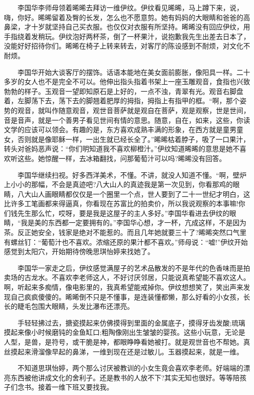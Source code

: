 \documentclass[12pt,UTF8]{ctexbook}
\begin{document}
　　李国华李师母领着晞晞去拜访一维伊纹。伊纹看见晞晞，马上蹲下来，说，嗨，你好。晞晞留着及臀的长发，怎么也不愿意剪。她有妈妈的大眼睛和爸爸的高鼻梁，才十岁就坚持自己买衣服。也仅仅对衣服有所坚持。晞晞没有回应伊纹，用手指绕着发稍玩。伊纹泡好两杯茶，倒了一杯果汁，说抱歉我先生出差去日本了，没能好好招待你们。晞晞在椅子上转来转去，对客厅的陈设感到不耐烦，对文化不耐烦。

　　李国华开始大谈客厅的摆饰。话语本能地在美女面前膨胀，像阳具一样。二十多岁的女人也不是完全不可以。他伸出指头指着书架上一座玉雕观音，食指也兴致勃勃的样子。玉观音一望即知原石是上好的，一点不浊，青翠有光。观音右脚盘着，左脚荡下去，荡下去的脚翘着肥厚的拇指，拇指上有指甲的框。\enquote{啊，那个姿势的观音，就叫作随意观音，观世音菩萨就是观自在菩萨，观是观察，世是世间，音是音声，就是一个善男子看见世间有情的意思。随意，自在，如来，这些，你读文学的应该可以领会。有趣的是，东方喜欢成熟丰满的形象，在西方就是童男童女，否则就是像耶稣一样，一出生就已经长全了。}晞晞枯着脖子，吸了一口果汁，转头对爸妈恶声说：\enquote{你们明知道我不喜欢柳橙汁。}伊纹知道晞晞的意思是她不喜欢听这些。她惊醒一样，去冰箱翻找，问那葡萄汁可以吗?晞晞没有回答。

　　李国华继续扫视。好多西洋美术，不懂。不讲，就没人知道不懂。\enquote{啊，壁炉上小小的那幅，不会是真迹吧?八大山人的真迹我是第一次见到，你看那鸡的眼睛，八大山人画眼睛都仅仅是一个圈里一个点，世人要到了二十一世纪才明白，这比许多工笔画都来得逼真，你看现在苏富比的拍卖价，所以我说观察的本事嘛!你们钱先生那么忙，哎呀，要是我是这屋子的主人多好。}李国华看进去伊纹的眼睛，\enquote{我是美的东西都一定要拥有的。}李国华心想，才一杯，亢成这样，不是因为茶。反正她安全，钱家是绝对不能惹的。而且几年她就要三十了?晞晞突然口气里有螺丝钉：\enquote{葡萄汁也不喜欢。浓缩还原的果汁都不喜欢。}师母说：\enquote{嘘!}伊纹开始感觉到太阳穴，开始期待傍晚思琪怡婷来找她了。

　　李国华一家走之后，伊纹感觉满屋子的艺术品散发的不是年代的色香味而是拍卖场的古龙水。不喜欢李老师这人，不好讨厌邻居，只能说真希望能不喜欢这人。啊，听起来多痴情，像电影里的，我真希望能戒掉你。伊纹想想笑了，笑出声来发现自己疯疯傻傻的。晞晞倒不只是不懂事，是连装懂都懒，那么好看的小女孩，长长的睫毛包围大眼睛，头发比瀑布还漂亮。

　　手轻轻拂过去，搪瓷摸起来仿佛摸得到里面的金属底子，摸得牙齿发酸;琉璃摸起来像小时候磨钝的金鱼缸口;粗陶像刚出生皱皱的婴孩。这些小玩意，无论是人型，是兽，是符号，或干脆是神，都眼睁睁看她被打。就是观世音也不帮她。真丝摸起来滑溜像早起的鼻涕，一维到现在还是过敏儿。玉器摸起来，就是一维。

　　不知道思琪怡婷，两个那么讨厌被教训的小女生竟会喜欢李老师。好端端的漂亮东西被他讲成文化的舍利子。还是教书的人放不下?其实无知也很好。等等陪孩子们念书。接着一维下班又要找我。
\end{document}
